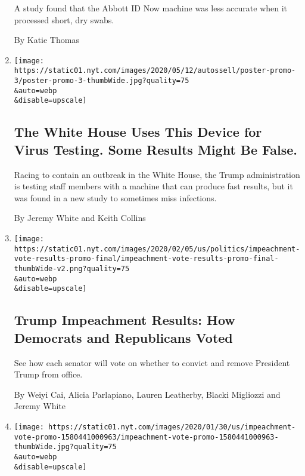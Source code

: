 \begin{enumerate}
  A study found that the Abbott ID Now machine was less accurate when it
  processed short, dry swabs.

  By Katie Thomas
\item
  \href{/interactive/2020/05/12/us/coronavirus-testing-white-house.html}{}

  \texttt{[image: https://static01.nyt.com/images/2020/05/12/autossell/poster-promo-3/poster-promo-3-thumbWide.jpg?quality=75\\\&auto=webp\\\&disable=upscale]}

  \hypertarget{the-white-house-uses-this-device-for-virus-testing-some-results-might-be-false}{%
  \subsection{The White House Uses This Device for Virus Testing. Some
  Results Might Be
  False.}\label{the-white-house-uses-this-device-for-virus-testing-some-results-might-be-false}}

  Racing to contain an outbreak in the White House, the Trump
  administration is testing staff members with a machine that can
  produce fast results, but it was found in a new study to sometimes
  miss infections.

  By Jeremy White and Keith Collins
\item
  \href{/interactive/2020/02/05/us/politics/impeachment-vote-results.html}{}

  \texttt{[image: https://static01.nyt.com/images/2020/02/05/us/politics/impeachment-vote-results-promo-final/impeachment-vote-results-promo-final-thumbWide-v2.png?quality=75\\\&auto=webp\\\&disable=upscale]}

  \hypertarget{trump-impeachment-results-how-democrats-and-republicans-voted}{%
  \subsection{Trump Impeachment Results: How Democrats and Republicans
  Voted}\label{trump-impeachment-results-how-democrats-and-republicans-voted}}

  See how each senator will vote on whether to convict and remove
  President Trump from office.

  By Weiyi Cai, Alicia Parlapiano, Lauren Leatherby, Blacki Migliozzi
  and Jeremy White
\item
  \href{/interactive/2020/01/31/us/politics/impeachment-vote.html}{}

  \texttt{[image: https://static01.nyt.com/images/2020/01/30/us/impeachment-vote-promo-1580441000963/impeachment-vote-promo-1580441000963-thumbWide.jpg?quality=75\\\&auto=webp\\\&disable=upscale]}


\end{enumerate}
